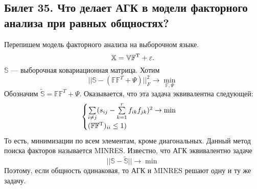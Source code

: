 \subsection{Билет 35. Что делает АГК в модели факторного анализа при равных общностях?}
Перепишем модель факторного анализа на выборочном языке.
\begin{equation*}
\mathbb{X} = \mathbb{V}\mathbb{F}^{\operatorname{T}} + \varepsilon.
\end{equation*}
$\mathbb{S}$ --- выборочная ковариационная матрица. 
Хотим 
\begin{equation*}
|| \mathbb{S} - (\mathbb{F}\mathbb{F}^T + \Psi)||^2_{F} \to \min\limits_{\mathbb{F}, \Psi}
\end{equation*}
Обозначим $\tilde{\mathbb{S}} = \mathbb{F}\mathbb{F}^T + \Psi$.
Оказывается, что эта задача эквивалентна следующей:
\begin{equation*}
\begin{cases}
\sum\limits_{i \ne j}(s_{ij} - \sum\limits_{k = 1}^{r} f_{ik}f_{jk})^2 \to \min \\
(\mathbb{F}\mathbb{F}^{\operatorname{T}})_{ii} \le 1) 
\end{cases}
\end{equation*}
То есть, минимизации по всем элементам, кроме диагональных.
Данный метод поиска факторов называется MINRES.
Известно, что АГК эквивалентно задаче
\begin{equation}
||\mathbb{S} - \tilde{\mathbb{S}}|| \to \min
\end{equation}
Поэтому, если общность одинаковая, то АГК и MINRES решают одну и ту же задачу.